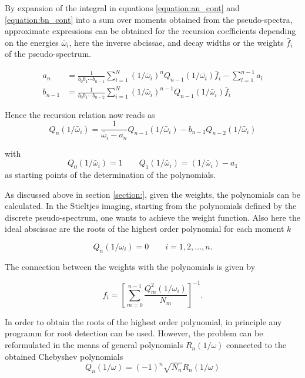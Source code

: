 By expansion of the integral in equations \ref{equation:an_cont} and
\ref{equation:bn_cont} into a sum over moments obtained from the pseudo-spectra,
approximate expressions can be obtained for the recursion coefficients
depending on the energies $\bar{\omega}_i$, here the inverse abcissae,
and decay widths or the weights $\bar{f}_i$ of the
pseudo-spectrum.

\begin{align}
  a_n     &= \frac{1}{b_0b_1\cdots b_{n-1}}
             \sum\limits_{i=1}^N
               (1/\bar{\omega}_i)^n Q_{n-1}(1/\bar{\omega_i}) \bar{f}_i
             - \sum\limits_{l=1}^{n-1} a_l \label{equation:an_dist}\\
  b_{n-1} &= \frac{1}{b_0b_1\cdots b_{n-2}}
             \sum\limits_{i=1}^N
               (1/\bar{\omega}_i)^{n-1} Q_{n-1}(1/\bar{\omega}_i) \bar{f}_i
\end{align}

Hence the recursion relation now reads as
\begin{equation}
  Q_n(1/\bar{\omega}_i) = \frac{1}{\bar{\omega}_i - a_n} Q_{n-1}(1/\bar{\omega}_i)
                          - b_{n-1} Q_{n-2}(1/\bar{\omega}_i)
\end{equation}

with
\begin{equation}
  Q_0(1/\bar{\omega}_i) = 1 \quad\quad Q_1(1/\bar{\omega}_i) = (1/\bar{\omega}_i) - a_1
\end{equation}
as starting points of the determination of the polynomials.

As discussed above in section \ref{section:}, given the weights, the polynomials
can be calculated. In the Stieltjes imaging, starting from the polynomials
defined by the discrete pseudo-spectrum, one wants to achieve the weight function.
Also here the ideal abscissae are the roots of the highest order polynomial
for each moment $k$

\begin{equation}
  Q_n(1/\omega_i) = 0 \quad\quad i = 1,2,\dots ,n .
\end{equation}

The connection between the weights with the polynomials is given by

\begin{equation}
  f_i = \left[ \sum\limits_{m=0}^{n-1} \frac{Q_m^2(1/\omega_i)}{N_m} \right]^{-1} .
\end{equation}

In order to obtain the roots of the highest order polynomial, in principle
any programm for root detection can be used. However, the problem can
be reformulated in the means of general polynomials $R_n(1/\omega)$ connected
to the obtained Chebyshev polynomials
\begin{equation}
  Q_n(1/\omega) = (-1)^n \sqrt{N_n} R_n(1/\omega)
\end{equation}

